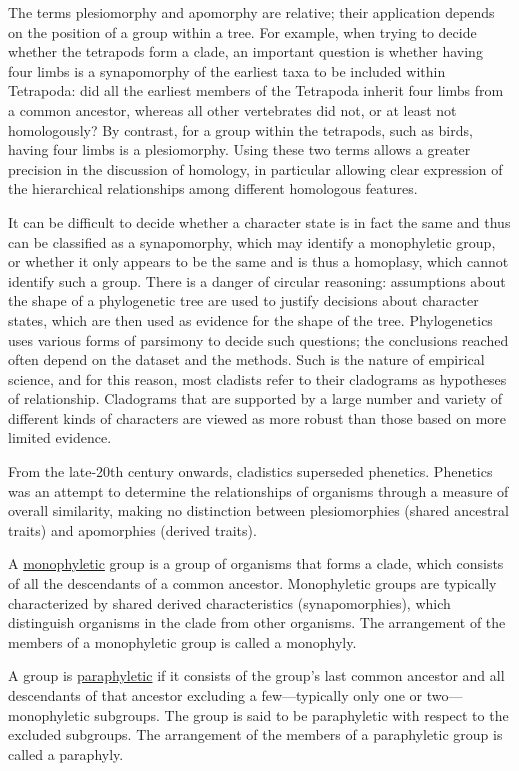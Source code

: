 The terms plesiomorphy and apomorphy are relative; their application depends on the position of a group within a tree. For example, when trying to decide whether the tetrapods form a clade, an important question is whether having four limbs is a synapomorphy of the earliest taxa to be included within Tetrapoda: did all the earliest members of the Tetrapoda inherit four limbs from a common ancestor, whereas all other vertebrates did not, or at least not homologously? By contrast, for a group within the tetrapods, such as birds, having four limbs is a plesiomorphy. Using these two terms allows a greater precision in the discussion of homology, in particular allowing clear expression of the hierarchical relationships among different homologous features.

It can be difficult to decide whether a character state is in fact the same and thus can be classified as a synapomorphy, which may identify a monophyletic group, or whether it only appears to be the same and is thus a homoplasy, which cannot identify such a group. There is a danger of circular reasoning: assumptions about the shape of a phylogenetic tree are used to justify decisions about character states, which are then used as evidence for the shape of the tree. Phylogenetics uses various forms of parsimony to decide such questions; the conclusions reached often depend on the dataset and the methods. Such is the nature of empirical science, and for this reason, most cladists refer to their cladograms as hypotheses of relationship. Cladograms that are supported by a large number and variety of different kinds of characters are viewed as more robust than those based on more limited evidence.

From the late-20th century onwards, cladistics superseded phenetics. Phenetics was an attempt to determine the relationships of organisms through a measure of overall similarity, making no distinction between plesiomorphies (shared ancestral traits) and apomorphies (derived traits).

A \href{https://en.wikipedia.org/wiki/Monophyly}{monophyletic} group is a group of organisms that forms a clade, which consists of all the descendants of a common ancestor. Monophyletic groups are typically characterized by shared derived characteristics (synapomorphies), which distinguish organisms in the clade from other organisms. The arrangement of the members of a monophyletic group is called a monophyly.

A group is \href{https://en.wikipedia.org/wiki/Paraphyly}{paraphyletic} if it consists of the group's last common ancestor and all descendants of that ancestor excluding a few---typically only one or two---monophyletic subgroups. The group is said to be paraphyletic with respect to the excluded subgroups. The arrangement of the members of a paraphyletic group is called a paraphyly.

